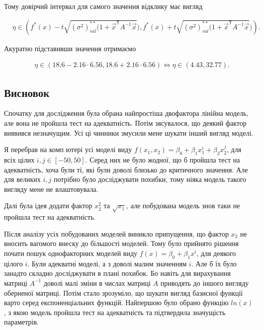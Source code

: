 \documentclass[14pt,a4paper]{scrartcl}
\theoremstyle{definition}
\theoremstyle{remark}
\theoremstyle{definition}
\theoremstyle{definition}
\begin{document}
Тому довірчий інтервал для самого значення відклику має вигляд

\begin{align*}
  & \eta \in \left( f^{*}(x) - t\sqrt{(\sigma^2)^{**}_{val} (1 + \vec{x}^\mathsf{T} A^{-1} \vec{x}}), f^{*}(x) + t\sqrt{(\sigma^2)^{**}_{val} (1 + \vec{x}^\mathsf{T} A^{-1} \vec{x}})  \right).
\end{align*}

Акуратно підставивши значення отримаємо

\begin{align*}
  & \eta \in \left( 18.6 - 2.16 \cdot 6.56, 18.6 + 2.16 \cdot 6.56  \right) \Leftrightarrow \eta \in \left( 4.43, 32.77  \right).
\end{align*}

\subsection{Висновок}

Спочатку для дослідження була обрана найпростіша двофактора лінійна модель, але вона не пройшла тест на адекватність. Потім з\textquotesingle ясувалося, що деякий фактор виявився незначущим. Усі ці чинники змусили мене шукати інший вигляд моделі.

Я перебрав на комп \textquotesingle ютері усі моделі виду $f(x_{1}, x_{2}) = \beta_{0} + \beta_{1} x_{1}^{i} + \beta_{2} x_{2}^{j}$, для всіх цілих $i, j \in [-50, 50]$. Серед них не було жодної, що б пройшла тест на адекватність, хоча були ті, які були доволі близько до критичного значення. Але для великих $i, j$ потрібно було досліджувати похибки, тому ніяка модель такого вигляду мене не влаштовувала.

Далі була ідея додати фактор $x_{2}^{2}$ та $\sqrt{x_{1}}$, але побудована модель знов таки не пройшла тест на адекватність.

Після аналізу усіх побудованих моделей виникло припущення, що фактор $x_{2}$ не вносить вагомого внеску до більшості моделей. Тому було прийнято рішення почати пошук однофакторних моделей виду $f(x) = \beta_{0} + \beta_{1} x^{i}$, для деякого цілого $i$. Були адекватні моделі, а з доволі малим значенням $i$. Але б їх було занадто складно досліджувати в плані похибок. Бо навіть для вирахування матриці $A^{-1}$ доволі малі зміни в числах матриці $A$ приводять до іншого вигляду оберненої матриці. Потім стало зрозуміло, що шукати вигляд базисної функції варто серед експоненціальних функцій. Найпершою було обрано функцію $ln(x)$, з якою модель пройшла тест на адекватність та підтвердила значущість параметрів.

\nocite{*}


\end{document}
